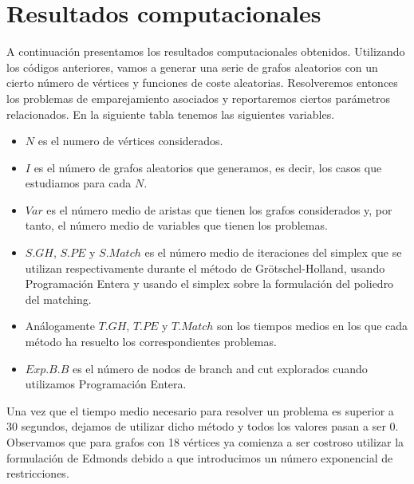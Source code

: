 \documentclass[twoside,a4paper,openright,12pt,tikz]{book}
\begin{document}
\section{Resultados computacionales}
A continuación presentamos los resultados computacionales obtenidos. Utilizando los códigos anteriores, vamos a generar una serie de grafos aleatorios con un cierto número de vértices y funciones de coste aleatorias. Resolveremos entonces los problemas de emparejamiento asociados y reportaremos ciertos parámetros relacionados. En la siguiente tabla tenemos las siguientes variables.
\begin{itemize}
\item $N$ es el numero de vértices considerados.
\item $I$ es el número de grafos aleatorios que generamos, es decir, los casos que estudiamos para cada $N$.
\item $Var$ es el número medio de aristas que tienen los grafos considerados y, por tanto, el número medio de variables que tienen los problemas.
\item $S.GH$, $S.PE$ y $S.Match$ es el número medio de iteraciones del simplex que se utilizan respectivamente durante el método de Grötschel-Holland, usando Programación Entera y usando el simplex sobre la formulación del poliedro del matching.
\item Análogamente $T.GH$, $T.PE$ y $T.Match$ son los tiempos medios en los que cada método ha resuelto los correspondientes problemas.
\item $Exp.B.B$ es el número de nodos de branch and cut explorados cuando utilizamos Programación Entera.
\end{itemize} 
Una vez que el tiempo medio necesario para resolver un problema es superior a 30 segundos, dejamos de utilizar dicho método y todos los valores pasan a ser $0$. Observamos que para grafos con 18 vértices ya comienza a ser costroso utilizar la formulación de Edmonds debido a que introducimos un número exponencial de restricciones.
\end{document}
